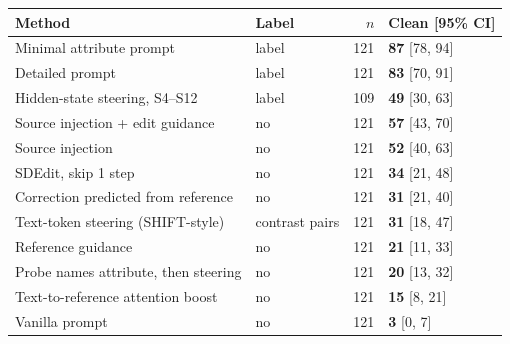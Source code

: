 \begin{tabular}{@{}llrl@{}}
\toprule
Method & Label & $n$ & Clean [95\% CI] \\
\midrule
Minimal attribute prompt & label & 121 & \textbf{87} [78, 94] \\
Detailed prompt & label & 121 & \textbf{83} [70, 91] \\
Hidden-state steering, S4--S12 & label & 109 & \textbf{49} [30, 63] \\
\midrule
Source injection + edit guidance & no & 121 & \textbf{57} [43, 70] \\
Source injection & no & 121 & \textbf{52} [40, 63] \\
SDEdit, skip 1 step & no & 121 & \textbf{34} [21, 48] \\
Correction predicted from reference & no & 121 & \textbf{31} [21, 40] \\
Text-token steering (SHIFT-style) & contrast pairs & 121 & \textbf{31} [18, 47] \\
Reference guidance & no & 121 & \textbf{21} [11, 33] \\
Probe names attribute, then steering & no & 121 & \textbf{20} [13, 32] \\
Text-to-reference attention boost & no & 121 & \textbf{15} [8, 21] \\
Vanilla prompt & no & 121 & \textbf{3} [0, 7] \\
\bottomrule
\end{tabular}